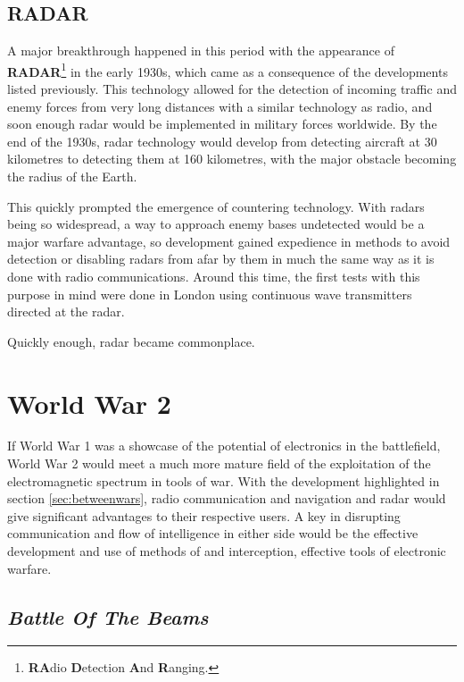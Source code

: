 \documentclass[english,purist]{ist-report}
\begin{document}
\subsection{RADAR}

A major breakthrough happened in this period with the appearance of \textbf{RADAR}\footnote{\textbf{RA}dio \textbf{D}etection \textbf{A}nd \textbf{R}anging.} in the early 1930s, which came as a consequence of the developments listed previously. This technology allowed for the detection of incoming traffic and enemy forces from very long distances with a similar technology as radio, and soon enough radar would be implemented in military forces worldwide. By the end of the 1930s, radar technology would develop from detecting aircraft at 30 kilometres to detecting them at 160 kilometres, with the major obstacle becoming the radius of the Earth.

This quickly prompted the emergence of countering technology. With radars being so widespread, a way to approach enemy bases undetected would be a major warfare advantage, so development gained expedience in methods to avoid detection or disabling radars from afar by \jamming{} them in much the same way as it is done with radio communications. Around this time, the first tests with this purpose in mind were done in London using continuous wave transmitters directed at the radar.

Quickly enough, radar \jamming{} became commonplace.

\section{World War 2}

If World War 1 was a showcase of the potential of electronics in the battlefield, World War 2 would meet a much more mature field of the exploitation of the electromagnetic spectrum in tools of war. With the development highlighted in section \ref{sec:betweenwars}, radio communication and navigation and radar would give significant advantages to their respective users. A key in disrupting communication and flow of intelligence in either side would be the effective development and use of methods of \jamming{} and interception, effective tools of electronic warfare.

\subsection{\textit{Battle Of The Beams}}
\end{document}
